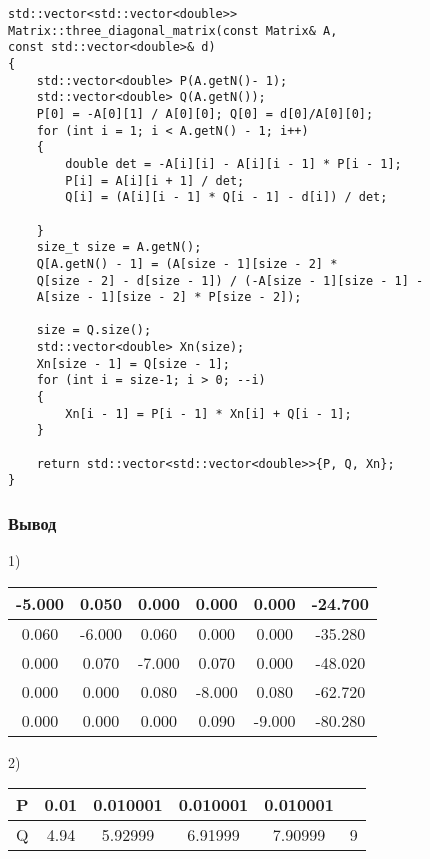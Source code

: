 \documentclass[bachelor, och, pract]{SCWorks}
\begin{document}
\begin{lstlisting}
std::vector<std::vector<double>> 
Matrix::three_diagonal_matrix(const Matrix& A, 
const std::vector<double>& d)
{
    std::vector<double> P(A.getN()- 1);
    std::vector<double> Q(A.getN());
    P[0] = -A[0][1] / A[0][0]; Q[0] = d[0]/A[0][0];
    for (int i = 1; i < A.getN() - 1; i++)
    {
        double det = -A[i][i] - A[i][i - 1] * P[i - 1];
        P[i] = A[i][i + 1] / det;
        Q[i] = (A[i][i - 1] * Q[i - 1] - d[i]) / det;
        
    }
    size_t size = A.getN();
    Q[A.getN() - 1] = (A[size - 1][size - 2] * 
    Q[size - 2] - d[size - 1]) / (-A[size - 1][size - 1] - 
    A[size - 1][size - 2] * P[size - 2]);

    size = Q.size();
    std::vector<double> Xn(size);
    Xn[size - 1] = Q[size - 1];
    for (int i = size-1; i > 0; --i)
    {
        Xn[i - 1] = P[i - 1] * Xn[i] + Q[i - 1];
    }

    return std::vector<std::vector<double>>{P, Q, Xn};
}    
\end{lstlisting}

\subsubsection{Вывод}

1)
\begin{table}[H]
    \centering
    \begin{tabular}{|c|c|c|c|c|c|}
\hline -5.000 & 0.050  & 0.000 & 0.000 &  0.000   &-24.700\\\hline
     0.060 & -6.000  &0.060 & 0.000 & 0.000 & -35.280\\\hline
     0.000 & 0.070  & -7.000  & 0.070& 0.000 & -48.020\\\hline
     0.000 & 0.000 &  0.080 & -8.000&  0.080  & -62.720\\\hline
     0.000 & 0.000  & 0.000 &  0.090&-9.000 & -80.280\\\hline
    \end{tabular}
\end{table}

2)
\begin{table}[H]
    \centering
    \begin{tabular}{|c|c|c|c|c|c|}
\hline P &0.01& 0.010001 &0.010001& 0.010001 &\\\hline
Q&4.94& 5.92999 &6.91999 &7.90999 &9 \\\hline
    \end{tabular}
\end{table}
\end{document}
